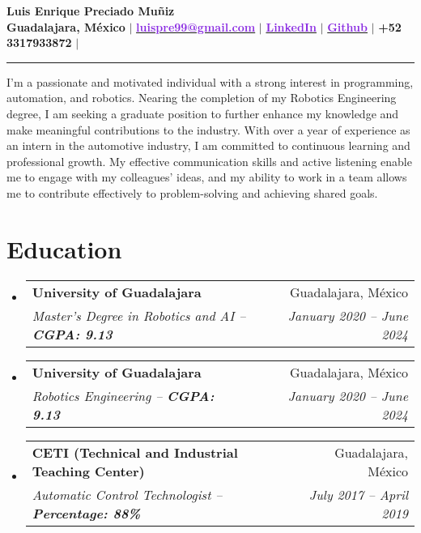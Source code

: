 \documentclass[a4paper,11pt]{article}
\makeatletter
\newcommand{\resumeSubheading}[4]{
  \vspace{-2pt}\item
    \begin{tabular*}{0.97\textwidth}[t]{l@{\extracolsep{\fill}}r}
      \textbf{#1} & #2 \\
      \textit{\small#3} & \textit{\small #4} \\
    \end{tabular*}\vspace{-7pt}
}
\newcommand{\resumeSubHeadingListStart}{\begin{itemize}[leftmargin=0.15in, label={}]}
\newcommand{\resumeSubHeadingListEnd}{\end{itemize}}
\makeatother
\begin{document}
\begin{center}
    \textbf{\huge Luis Enrique Preciado Muñiz} \\ \vspace{8pt}
    \faMapMarker\enspace \textbf{Guadalajara, México} $|$
    \href{luispre99@gmail.com}{\textcolor{BlueViolet}{\faEnvelopeO\enspace \textbf{luispre99@gmail.com}}} $|$  
    \href{https://www.linkedin.com/in/luispreciado/}{\textcolor{BlueViolet}{\faLinkedin\enspace \textbf{LinkedIn}}} $|$
    \href{https://github.com/lepcodes}{\textcolor{BlueViolet}{\faGithub\enspace \textbf{Github}}} $|$
    \small {\faMobile\enspace \textbf{+52 3317933872}} $|$
\end{center}

\vspace{-12pt}
\rule{\textwidth}{0.1pt}

\vspace{2pt}
I'm a passionate and motivated individual with a strong interest in programming, automation, and robotics. Nearing the completion of my Robotics Engineering degree, I am seeking a graduate position to further enhance my knowledge and make meaningful contributions to the industry. With over a year of experience as an intern in the automotive industry, I am committed to continuous learning and professional growth. My effective communication skills and active listening enable me to engage with my colleagues' ideas, and my ability to work in a team allows me to contribute effectively to problem-solving and achieving shared goals.

\section{\Large{Education}}
  \resumeSubHeadingListStart
    \resumeSubheading
      {University of Guadalajara}{Guadalajara, México}
      {Master's Degree in Robotics and AI -- \textbf{CGPA: 9.13}}{January 2020 -- June 2024}
    \resumeSubheading
      {University of Guadalajara}{Guadalajara, México}
      {Robotics Engineering -- \textbf{CGPA: 9.13}}{January 2020 -- June 2024}
    \resumeSubheading
      {CETI (Technical and Industrial Teaching Center)}{Guadalajara, México}
      {Automatic Control Technologist -- \textbf{Percentage: 88\%}}{July 2017 -- April 2019}
  \resumeSubHeadingListEnd

\end{document}
